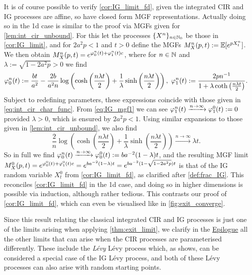 It is of course possible to verify \autoref{cor:IG_limit_fd}, given the integrated CIR and IG processes are affine, so have closed form MGF representations. Actually doing so in the 1d case is similar to the proof via MGFs given for \autoref{lem:int_cir_unbound}. For this let the processes $\{X^n\}_{n\in\mathbb{N}_0}$ be those in \autoref{cor:IG_limit}, and for $2a^2p<1$ and $t>0$ define the MGFs $M^n_X(p,t):=\mathbb{E}[e^{pX^n_t}]$. We then obtain $M^n_X(p,t) = e^{\varphi^n_0(t)+\varphi^n_1(t)c}$, where for $n\in\mathbb{N}$ and $\lambda:=\sqrt{1-2a^2 p}>0$ we find
\begin{equation}\label{eq:IG_mgf1}
    \vp^n_0(t):= \frac{bt}{a^2}- \frac{2b}{a^2 n}\log\left(\cosh\left(\frac{n \lambda t}{2}\right) + \frac{1}{\lambda}\sinh\left(\frac{n \lambda t}{2}\right)\right),\ \vp^n_1(t):= \frac{2pn^{-1}}{1 + \lambda\coth\left(\frac{n \lambda t}{2}\right)}.
\end{equation}
Subject to redefining parameters, these expressions coincide with those given in \autoref{eq:int_cir_char_func}. From \autoref{eq:IG_mgf1} we can see $\varphi_1^n(t)\xrightarrow{n\to\infty}\varphi_1^0(t) := 0$ provided $\lambda>0$, which is ensured by $2a^2p<1$. Using similar expansions to those given in \autoref{lem:int_cir_unbound}, we also find
\begin{equation}
    \frac{2}{n}\log\left(\cosh\left(\frac{n \lambda t}{2}\right) + \frac{1}{\lambda}\sinh\left(\frac{n \lambda t}{2}\right)\right)\xrightarrow{n\to\infty}\lambda t.
\end{equation}
So in full we find $\varphi_0^n(t)\xrightarrow{n\to\infty}\varphi_0^0(t) := ba^{-2}(1 - \lambda)t$, and the resulting MGF limit $M^0_X(p,t) = e^{\varphi^0_0(t)+\varphi^0_1(t)c} = e^{ba^{-2}(1-\lambda)t} = e^{ba^{-2}(1-\sqrt{1-2a^2 p})t}$ is that of the IG random variable $X^0_t$ from \autoref{cor:IG_limit_fd}, as clarified after \autoref{def:frac_IG}. This reconciles \autoref{cor:IG_limit_fd} in the 1d case, and doing so in higher dimensions is possible via induction, although rather tedious. This contrasts our proof of \autoref{cor:IG_limit_fd}, which can even be visualised like in \autoref{fig:exit_converge}.

Since this result relating the classical integrated CIR and IG processes is just one of the limits arising when applying \autoref{thm:exit_limit}, we clarify in the \hyperlink{epilogue}{Epilogue} all the other limits that can arise when the CIR processes are parameterised differently. These include the \emph{L\'evy} L\'evy process which, as \cite{applebaum_2009} shows, can be considered a special case of the IG L\'evy process, and both of these L\'evy processes can also arise with random starting points.

